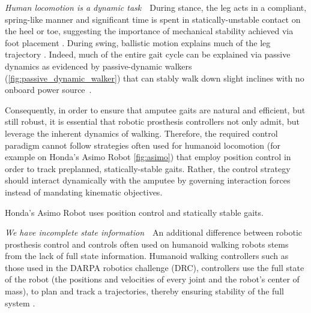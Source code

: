 \begin{challenges}
    \item\label{chal:dynamic} \emph{Human locomotion is a dynamic task}~~During
    stance, the leg acts in a compliant, spring-like manner
    \citep{geyer2006compliant} and significant time is spent in
    statically-unstable contact on the heel or toe, suggesting the importance of
    mechanical stability achieved via foot placement \citep{perry1992gait}.
    During swing, ballistic motion explains much of the leg trajectory
    \citep{mochon1980ballistic}. Indeed, much of the entire gait cycle can be
    explained via passive dynamics as evidenced by passive-dynamic walkers
    (\cref{fig:passive_dynamic_walker}) that can stably walk down slight
    inclines with no onboard power source~\citep{mcgeer1990passive,
    collins2005efficient}.

    Consequently, in order to ensure that amputee gaits are natural and
    efficient, but still robust, it is essential that robotic prosthesis
    controllers not only admit, but leverage the inherent dynamics of walking.
    Therefore, the required control paradigm cannot follow strategies often used
    for humanoid locomotion (for example on Honda's Asimo Robot
    \cref{fig:asimo}) that employ position control in order to track preplanned,
    statically-stable gaits. Rather, the control strategy should interact
    dynamically with the amputee by governing interaction forces instead of
    mandating kinematic objectives.

    \begin{marginfigure}
        \centering
        \caption{Honda's Asimo Robot uses position control and statically
        stable gaits.}
        \label{fig:asimo}
    \end{marginfigure}

    \item\label{chal:incomplete_state} \emph{We have incomplete state
    information}~~An additional difference between robotic prosthesis control
    and controls often used on humanoid walking robots stems from the lack of
    full state information.  Humanoid walking controllers such as those used in
    the DARPA robotics challenge (DRC), controllers use the full state of the
    robot (\ie the positions and velocities of every joint and the robot's
    center of mass), to plan and track a trajectories, thereby ensuring
    stability of the full system \citep{feng2015optimization,
    kuindersma2014efficiently, englsberger2014trajectory}.


\end{challenges}
